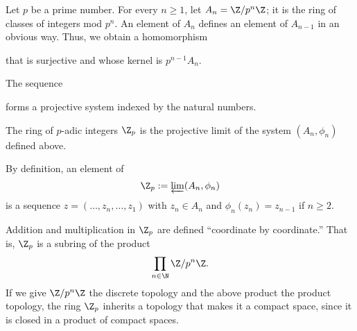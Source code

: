 \documentclass [preview, border = 20pt] {standalone}
\begin{document}
\pagecolor{black}
\color{white}
Let $p$ be a prime number. For every $n\ge 1$, let $A_n = \Z/p^n\Z$; it is the ring of classes of integers mod $p^n$. An element of $A_n$ defines an element of $A_{n-1}$ in an obvious way. Thus, we obtain a homomorphism
\begin{center}
\end{center} 
that is surjective and whose kernel is $p^{n-1}A_n$.

The sequence
\begin{center}
\end{center} 
forms a projective system indexed by the natural numbers.

The ring of $p$-adic integers $\Z_p$ is the projective limit of the system $(A_n,\phi_n)$ defined above.

By definition, an element of 
\[
\Z_p := \varprojlim (A_n,\phi_n)
\]
is a sequence $z = (\hdots, z_n,\hdots, z_1)$ with $z_n\in A_n$ and $\phi_n(z_n) = z_{n-1}$ if $n\ge 2$.

Addition and multiplication in $\Z_p$ are defined ``coordinate by coordinate.'' That is, $\Z_p$ is a subring of the product 
\[
 \prod_{n\in\N} \Z/p^n\Z.
\] 
If we give $\Z/p^n\Z$ the discrete topology and the above product the product topology, the ring $\Z_p$ inherits a topology that makes it a compact space, since it is closed in a product of compact spaces.
\end{document}
